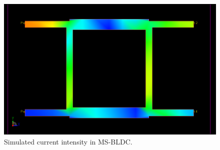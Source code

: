 \begin{figure}[h t b p]
	\centering
	\includegraphics[width=\textwidth,keepaspectratio]{figures/sim_field_colors.png}
	\caption{Simulated current intensity in MS-BLDC.}
	\label{fig:big-sim-field-colors}
\end{figure}